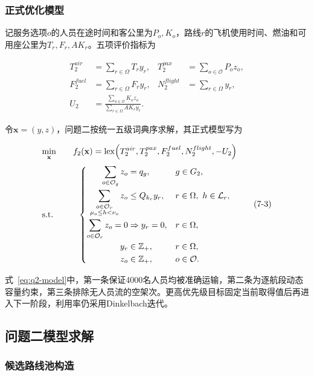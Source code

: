 \subsubsection{正式优化模型}

记服务选项$o$的人员在途时间和客公里为$P_o,K_o$，路线$r$的飞机使用时间、燃油和可用座公里为$T_r,F_r,AK_r$。五项评价指标为

\[
\begin{aligned}
T_2^{air}&=\sum_{r\in\Omega}T_ry_r, &
T_2^{pax}&=\sum_{o\in\mathcal O}P_oz_o,\\
F_2^{fuel}&=\sum_{r\in\Omega}F_ry_r, &
N_2^{flight}&=\sum_{r\in\Omega}y_r,\\
U_2&=\frac{\sum_{o\in\mathcal O}K_oz_o}
{\sum_{r\in\Omega}AK_ry_r}.
\end{aligned}
\tag{7-2}\label{eq:q2-metrics}
\]

令$\mathbf{x}=(y,z)$，问题二按统一五级词典序求解，其正式模型写为

\[
\begin{array}{@{}l@{\qquad}c@{}}
\displaystyle \min_{\mathbf{x}}
&
\displaystyle
f_2(\mathbf{x})
=
\operatorname{lex}\!\left(
T_2^{air},T_2^{pax},F_2^{fuel},N_2^{flight},-U_2
\right)
\\[1.0em]
\mathrm{s.t.}
&
\left\{
\begin{aligned}
\sum_{o\in\mathcal O_g}z_o &= q_g,
&& g\in G_2,\\
\sum_{\substack{o\in\mathcal O_r\\ \mu_o\le h<\nu_o}}z_o
&\le Q_{k_r}y_r,
&& r\in\Omega,\ h\in\mathcal L_r,\\
\sum_{o\in\mathcal O_r}z_o=0
&\Rightarrow y_r=0,
&& r\in\Omega,\\
y_r&\in\mathbb Z_+,
&& r\in\Omega,\\
z_o&\in\mathbb Z_+,
&& o\in\mathcal O.
\end{aligned}
\right.
\end{array}
\tag{7-3}\label{eq:q2-model}
\]

式~\eqref{eq:q2-model}中，第一条保证4000名人员均被准确运输，第二条为逐航段动态容量约束，第三条排除无人员流的空架次。更高优先级目标固定当前取得值后再进入下一阶段，利用率仍采用Dinkelbach迭代。

\subsection{问题二模型求解}\label{subsec:q2-solution}

\subsubsection{候选路线池构造}

